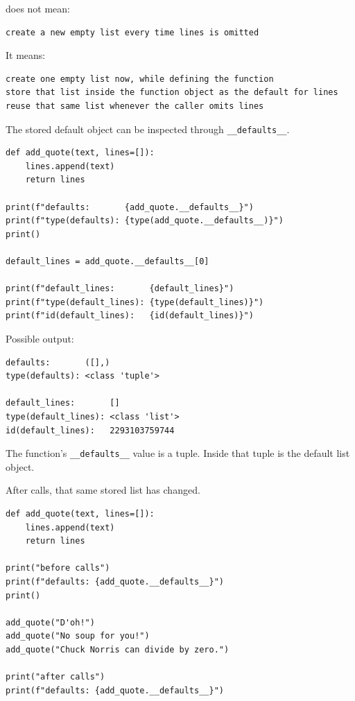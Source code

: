 does not mean:

\begin{verbatim}
create a new empty list every time lines is omitted
\end{verbatim}

It means:

\begin{verbatim}
create one empty list now, while defining the function
store that list inside the function object as the default for lines
reuse that same list whenever the caller omits lines
\end{verbatim}

The stored default object can be inspected through \texttt{\_\_defaults\_\_}.

\begin{verbatim}
def add_quote(text, lines=[]):
    lines.append(text)
    return lines

print(f"defaults:       {add_quote.__defaults__}")
print(f"type(defaults): {type(add_quote.__defaults__)}")
print()

default_lines = add_quote.__defaults__[0]

print(f"default_lines:       {default_lines}")
print(f"type(default_lines): {type(default_lines)}")
print(f"id(default_lines):   {id(default_lines)}")
\end{verbatim}

Possible output:

\begin{verbatim}
defaults:       ([],)
type(defaults): <class 'tuple'>

default_lines:       []
type(default_lines): <class 'list'>
id(default_lines):   2293103759744
\end{verbatim}

The function's \texttt{\_\_defaults\_\_} value is a tuple. Inside that tuple is the default list object.

After calls, that same stored list has changed.

\begin{verbatim}
def add_quote(text, lines=[]):
    lines.append(text)
    return lines

print("before calls")
print(f"defaults: {add_quote.__defaults__}")
print()

add_quote("D'oh!")
add_quote("No soup for you!")
add_quote("Chuck Norris can divide by zero.")

print("after calls")
print(f"defaults: {add_quote.__defaults__}")
\end{verbatim}

